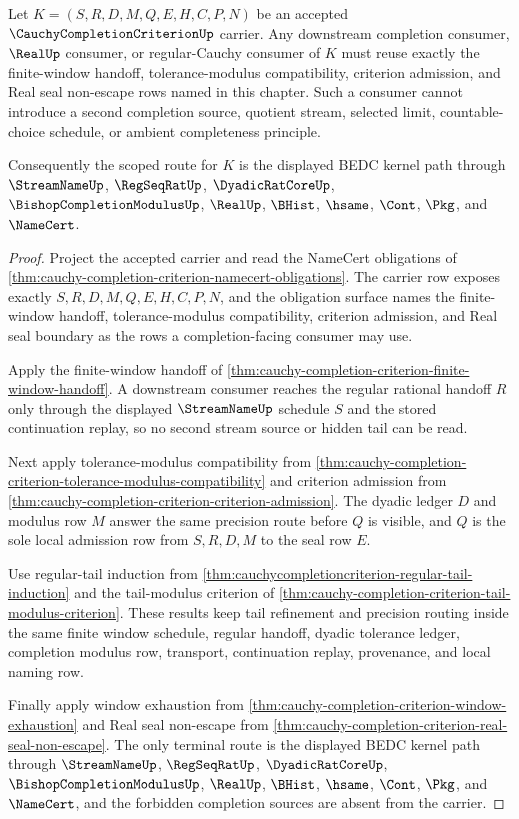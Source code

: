 \begin{theorem}
\label{thm:cauchy-completion-criterion-scope-lock}
Let $K=(S,R,D,M,Q,E,H,C,P,N)$ be an accepted $\CauchyCompletionCriterionUp$ carrier. Any downstream completion consumer, $\RealUp$ consumer, or regular-Cauchy consumer of $K$ must reuse exactly the finite-window handoff, tolerance-modulus compatibility, criterion admission, and Real seal non-escape rows named in this chapter. Such a consumer cannot introduce a second completion source, quotient stream, selected limit, countable-choice schedule, or ambient completeness principle.

Consequently the scoped route for $K$ is the displayed BEDC kernel path through $\StreamNameUp$, $\RegSeqRatUp$, $\DyadicRatCoreUp$, $\BishopCompletionModulusUp$, $\RealUp$, $\BHist$, $\hsame$, $\Cont$, $\Pkg$, and $\NameCert$.
\end{theorem}
\begin{proof}
Project the accepted carrier and read the NameCert obligations of \autoref{thm:cauchy-completion-criterion-namecert-obligations}. The carrier row exposes exactly $S,R,D,M,Q,E,H,C,P,N$, and the obligation surface names the finite-window handoff, tolerance-modulus compatibility, criterion admission, and Real seal boundary as the rows a completion-facing consumer may use.

Apply the finite-window handoff of \autoref{thm:cauchy-completion-criterion-finite-window-handoff}. A downstream consumer reaches the regular rational handoff $R$ only through the displayed $\StreamNameUp$ schedule $S$ and the stored continuation replay, so no second stream source or hidden tail can be read.

Next apply tolerance-modulus compatibility from \autoref{thm:cauchy-completion-criterion-tolerance-modulus-compatibility} and criterion admission from \autoref{thm:cauchy-completion-criterion-criterion-admission}. The dyadic ledger $D$ and modulus row $M$ answer the same precision route before $Q$ is visible, and $Q$ is the sole local admission row from $S,R,D,M$ to the seal row $E$.

Use regular-tail induction from \autoref{thm:cauchycompletioncriterion-regular-tail-induction} and the tail-modulus criterion of \autoref{thm:cauchy-completion-criterion-tail-modulus-criterion}. These results keep tail refinement and precision routing inside the same finite window schedule, regular handoff, dyadic tolerance ledger, completion modulus row, transport, continuation replay, provenance, and local naming row.

Finally apply window exhaustion from \autoref{thm:cauchy-completion-criterion-window-exhaustion} and Real seal non-escape from \autoref{thm:cauchy-completion-criterion-real-seal-non-escape}. The only terminal route is the displayed BEDC kernel path through $\StreamNameUp$, $\RegSeqRatUp$, $\DyadicRatCoreUp$, $\BishopCompletionModulusUp$, $\RealUp$, $\BHist$, $\hsame$, $\Cont$, $\Pkg$, and $\NameCert$, and the forbidden completion sources are absent from the carrier.
\end{proof}

